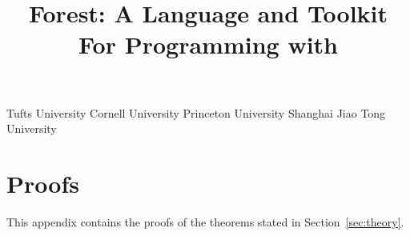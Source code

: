 \documentclass[nocopyrightspace,natbib,preprint]{sigplanconf}
\newif\ifanon\anonfalse  %
\begin{document}


\copyrightdata{} 

\title{Forest: A Language and Toolkit For Programming with \Filestores{}}

\ifanon
\authorinfo{\vskip -2in}
 	   {\vskip -2in}
           {}
\else
{}
	   {Tufts University}{}
           {Cornell University}{}
           {Princeton University}{}
           {Shanghai Jiao Tong University}{}
\fi

\maketitle{}

\begin{abstract}  

\end{abstract}













\ifanon
\else

\fi




\ifanon
\else
\onecolumn
\newpage
\appendix

\closeproofchan
\section{Proofs}

\noindent This appendix contains the proofs of the theorems stated in
Section~\ref{sec:theory}.

\label{sec:proof-appendix}



\fi
\end{document}
